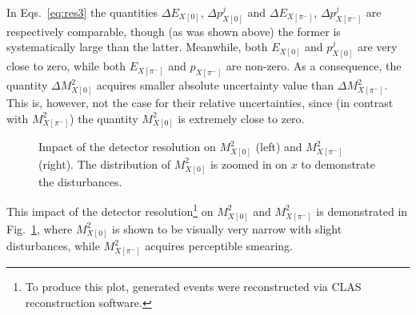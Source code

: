 In Eqs.~\eqref{eq:res3} the quantities $\Delta E_{X[0]}$, $\Delta p_{X[0]}^{j}$ and $ \Delta E_{X[\pi^{-}]}$, $\Delta p_{X[\pi^{-}]}^{j}$ are respectively comparable, though (as was shown above) the former is systematically large than the latter. Meanwhile, both $E_{X[0]}$ and $p_{X[0]}^{j}$ are very close to zero, while both $E_{X[\pi^{-}]}$ and $p_{X[\pi^{-}]}$ are non-zero. As a consequence, the quantity $\Delta M_{X[0]}^{2}$ acquires smaller absolute uncertainty value than $\Delta M_{X[\pi^{-}]}^{2} $. This is, however, not the case for their relative uncertainties, since (in contrast with $M_{X[\pi^{-}]}^{2}$) the quantity $M_{X[0]}^{2}$ is extremely close to zero.




\begin{figure}[htp]
\begin{center}
\caption{\small Impact of the detector resolution on $M_{X[0]}^{2}$ (left) and $M_{X[\pi^{-}]}^{2}$ (right). The distribution of $M_{X[0]}^{2}$ is zoomed in on $x$ to demonstrate the disturbances.} \label{fig:mm_res}
\end{center}
\end{figure}
\vspace{-1.5em}

This impact of the detector resolution\footnote[4]{To produce this plot, generated events were reconstructed via CLAS reconstruction software.} on $M_{X[0]}^{2}$ and $M_{X[\pi^{-}]}^{2}$ is demonstrated in Fig.~\ref{fig:mm_res}, where $M_{X[0]}^{2}$ is shown to be visually very narrow with slight disturbances, while $M_{X[\pi^{-}]}^{2}$ acquires perceptible smearing. 

